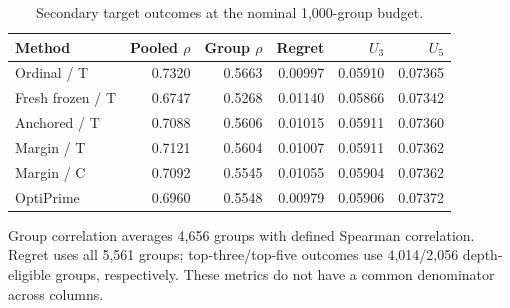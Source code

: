 \begin{table}[htbp]
\centering\small
\caption{Secondary target outcomes at the nominal 1,000-group budget.}
\label{tab:secondary}
\begin{tabular}{lrrrrr}
\toprule
Method & Pooled $\rho$ & Group $\rho$ & Regret & $U_3$ & $U_5$ \\
\midrule
Ordinal / T & 0.7320 & 0.5663 & 0.00997 & 0.05910 & 0.07365 \\
Fresh frozen / T & 0.6747 & 0.5268 & 0.01140 & 0.05866 & 0.07342 \\
Anchored / T & 0.7088 & 0.5606 & 0.01015 & 0.05911 & 0.07360 \\
Margin / T & 0.7121 & 0.5604 & 0.01007 & 0.05911 & 0.07362 \\
Margin / C & 0.7092 & 0.5545 & 0.01055 & 0.05904 & 0.07362 \\
OptiPrime & 0.6960 & 0.5548 & 0.00979 & 0.05906 & 0.07372 \\
\bottomrule
\end{tabular}
\par\smallskip
\begin{minipage}{\linewidth}\footnotesize Group correlation averages 4,656 groups with defined Spearman correlation. Regret uses all 5,561 groups; top-three/top-five outcomes use 4,014/2,056 depth-eligible groups, respectively. These metrics do not have a common denominator across columns.\end{minipage}
\end{table}
